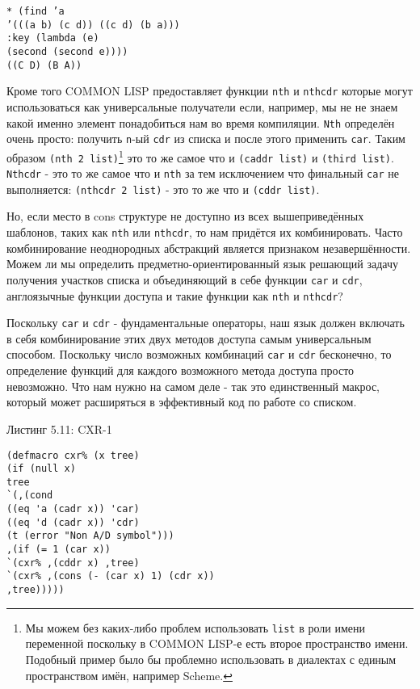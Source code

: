 \begin{verbatim}
* (find ’a
’(((a b) (c d)) ((c d) (b a)))
:key (lambda (e)
(second (second e))))
((C D) (B A))
\end{verbatim}

Кроме того COMMON LISP предоставляет функции \verb"nth" и \verb"nthcdr" которые могут использоваться как универсальные получатели если, например, мы не не знаем какой именно элемент понадобиться нам во время компиляции. \verb"Nth" определён очень просто: получить \verb"n"-ый \verb"cdr" из списка и после этого применить \verb"car". Таким образом \verb"(nth 2 list)"\footnote{Мы можем без каких-либо проблем использовать \verb"list" в роли имени переменной поскольку в COMMON LISP-е есть второе пространство имени. Подобный пример было бы проблемно использовать в диалектах с единым пространством имён, например Scheme.} это то же самое что и \verb"(caddr list)" и \verb"(third list)". \verb"Nthcdr" - это то же самое что и \verb"nth" за тем исключением что финальный \verb"car" не выполняется: \verb"(nthcdr 2 list)" - это то же что и \verb"(cddr list)".



Но, если место в cons структуре не доступно из всех вышеприведённых шаблонов, таких как \verb"nth" или \verb"nthcdr", то нам придётся их комбинировать. Часто комбинирование неоднородных абстракций является признаком незавершённости. Можем ли мы определить предметно-ориентированный язык решающий задачу получения участков списка и объединяющий в себе функции \verb"car" и \verb"cdr", англоязычные функции доступа и такие функции как \verb"nth" и \verb"nthcdr"?

Поскольку \verb"car" и \verb"cdr" - фундаментальные операторы, наш язык должен включать в себя комбинирование этих двух методов доступа самым универсальным способом. Поскольку число возможных комбинаций \verb"car" и \verb"cdr" бесконечно, то определение функций для каждого возможного метода доступа просто невозможно. Что нам нужно на самом деле - так это единственный макрос, который может расширяться в эффективный код по работе со списком.

Листинг 5.11: CXR-1\label{listing_5.11}
\listbegin
\begin{verbatim}
(defmacro cxr% (x tree)
(if (null x)
tree
`(,(cond
((eq 'a (cadr x)) 'car)
((eq 'd (cadr x)) 'cdr)
(t (error "Non A/D symbol")))
,(if (= 1 (car x))
`(cxr% ,(cddr x) ,tree)
`(cxr% ,(cons (- (car x) 1) (cdr x))
,tree)))))
\end{verbatim}
\listend

